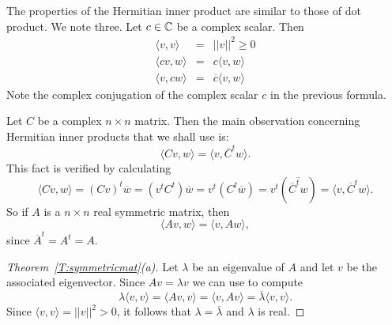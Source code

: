 \documentclass{ximera}
\begin{document}
The properties of the Hermitian inner product are similar to those of dot
product.  We note three.  Let $c\in\mbox{$\Bbb{C}$}$ be a complex scalar.  Then
\begin{eqnarray*}
\langle v,v \rangle & = & ||v||^2\ge 0\\
\langle cv,w \rangle & = & c\langle v,w \rangle \\
\langle v,cw \rangle & = & \overline{c} \langle v,w \rangle
\end{eqnarray*}
Note the complex conjugation of the complex scalar $c$ in the previous
formula.

Let $C$ be a complex $n\times n$ matrix.  Then the main observation
concerning Hermitian inner products that we shall use is:
\[
\langle Cv,w \rangle = \langle v,\overline{C}^tw \rangle.
\]
This fact is verified by calculating
\[
\langle Cv,w \rangle = (Cv)^t\overline{w} = (v^tC^t)\overline{w}
= v^t(C^t\overline{w}) = v^t(\overline{\overline{C}^tw})
= \langle v,\overline{C}^tw \rangle.
\]
So if $A$ is a $n\times n$ real symmetric matrix, then
\begin{equation}   \label{e:symminv}
\langle Av,w \rangle = \langle v,Aw \rangle,
\end{equation}
since $\overline{A}^t= A^t = A$.

\begin{proof}[Theorem~\ref{T:symmetricmat}(a)]  Let $\lambda$
be an eigenvalue of $A$ and let $v$ be the associated eigenvector. Since
$Av=\lambda v$ we can use  to compute
\[
\lambda \langle v,v \rangle = \langle Av,v \rangle = \langle v,Av \rangle
= \overline{\lambda} \langle v,v \rangle.
\]
Since $\langle v,v \rangle = ||v||^2 > 0$, it follows that
$\lambda=\overline{\lambda}$ and $\lambda$ is real.  \end{proof}
\end{document}
